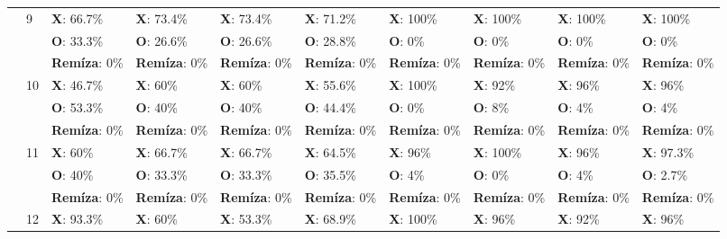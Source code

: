 \begin{table}[H]
\begin{tiny}
\begin{tabular}{|l|l|l|l|l||l|||l|l|l||l|}
            \cline{2-10}
            & \multirow{3}{*}{9}
            & \textbf{X}: 66.7\% & \textbf{X}: 73.4\% & \textbf{X}: 73.4\% & \textbf{X}: 71.2\%                         & \textbf{X}: 100\% & \textbf{X}: 100\% & \textbf{X}: 100\% & \textbf{X}: 100\% \\
            & & \textbf{O}: 33.3\% & \textbf{O}: 26.6\% & \textbf{O}: 26.6\% & \textbf{O}: 28.8\%                       & \textbf{O}: 0\% & \textbf{O}: 0\% & \textbf{O}: 0\% & \textbf{O}: 0\% \\
            & & \textbf{Remíza}: 0\% & \textbf{Remíza}: 0\% & \textbf{Remíza}: 0\% & \textbf{Remíza}: 0\%               & \textbf{Remíza}: 0\% & \textbf{Remíza}: 0\% & \textbf{Remíza}: 0\% & \textbf{Remíza}: 0\% \\
            \cline{2-10}
            & \multirow{3}{*}{10}
            & \textbf{X}: 46.7\% & \textbf{X}: 60\% & \textbf{X}: 60\% & \textbf{X}: 55.6\%                             & \textbf{X}: 100\% & \textbf{X}: 92\% & \textbf{X}: 96\% & \textbf{X}: 96\% \\
            & & \textbf{O}: 53.3\% & \textbf{O}: 40\% & \textbf{O}: 40\% & \textbf{O}: 44.4\%                           & \textbf{O}: 0\% & \textbf{O}: 8\% & \textbf{O}: 4\% & \textbf{O}: 4\% \\
            & & \textbf{Remíza}: 0\% & \textbf{Remíza}: 0\% & \textbf{Remíza}: 0\% & \textbf{Remíza}: 0\%               & \textbf{Remíza}: 0\% & \textbf{Remíza}: 0\% & \textbf{Remíza}: 0\% & \textbf{Remíza}: 0\% \\
            \cline{2-10}
            & \multirow{3}{*}{11}
            & \textbf{X}: 60\% & \textbf{X}: 66.7\% & \textbf{X}: 66.7\% & \textbf{X}: 64.5\%                           & \textbf{X}: 96\% & \textbf{X}: 100\% & \textbf{X}: 96\% & \textbf{X}: 97.3\% \\
            & & \textbf{O}: 40\% & \textbf{O}: 33.3\% & \textbf{O}: 33.3\% & \textbf{O}: 35.5\%                         & \textbf{O}: 4\% & \textbf{O}: 0\% & \textbf{O}: 4\% & \textbf{O}: 2.7\% \\
            & & \textbf{Remíza}: 0\% & \textbf{Remíza}: 0\% & \textbf{Remíza}: 0\% & \textbf{Remíza}: 0\%               & \textbf{Remíza}: 0\% & \textbf{Remíza}: 0\% & \textbf{Remíza}: 0\% & \textbf{Remíza}: 0\% \\
            \cline{2-10}
            & \multirow{3}{*}{12}
            & \textbf{X}: 93.3\% & \textbf{X}: 60\% & \textbf{X}: 53.3\% & \textbf{X}: 68.9\%                           & \textbf{X}: 100\% & \textbf{X}: 96\% & \textbf{X}: 92\% & \textbf{X}: 96\% \\

\end{tabular}
\end{tiny}
\end{table}
